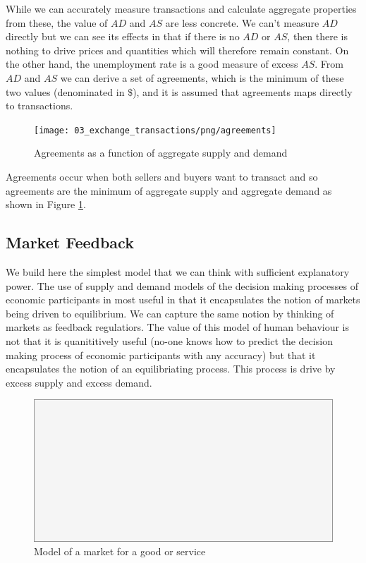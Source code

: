While we can accurately measure transactions and calculate aggregate properties from these, the
value of $AD$ and $AS$ are less concrete. We can't measure $AD$ directly but we can see its effects
in that if there is no $AD$ or $AS$, then there is nothing to drive prices and quantities which will
therefore remain constant. On the other hand, the unemployment rate is a good measure of excess
$AS$. From $AD$ and $AS$ we can derive a set of agreements, which is the minimum of these two values
(denominated in $\$$), and it is assumed that agreements maps directly to transactions.

\begin{figure}[H]
\centering
\texttt{[image: 03\_exchange\_transactions/png/agreements]}
\caption{Agreements as a function of aggregate supply and demand}
\label{fig:agreements}
\end{figure}

Agreements occur when both sellers and buyers want to transact and so agreements are the minimum of
aggregate supply and aggregate demand as shown in Figure \ref{fig:agreements}.

\subsection{Market Feedback}  

We build here the simplest model that we can think with sufficient explanatory power. The use of
supply and demand models of the decision making processes of economic participants in most useful in
that it encapsulates the notion of markets being driven to equilibrium. We can capture the same
notion by thinking of markets as feedback regulatiors. The value of this model of human behaviour is
not that it is quanititively useful (no-one knows how to predict the decision making process of
economic participants with any accuracy) but that it encapsulates the notion of an equilibriating
process. This process is drive by excess supply and excess demand.

\begin{figure}[H]
\centering
\includegraphics[scale=0.48]{blank}
\caption{Model of a market for a good or service}
\label{fig:micro_feedback}
\end{figure}


